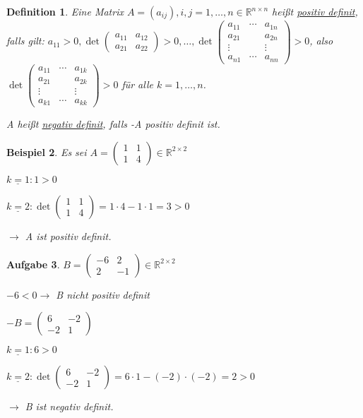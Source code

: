 \documentclass[12pt,a4paper]{scrreprt}
\newtheorem{defi}{Definition}[section]
\newtheorem{beispiel}[defi]{Beispiel}
\newtheorem{aufg}[defi]{Aufgabe}
\begin{document}
\begin{defi}
	Eine Matrix $A=(a_{ij}), i,j=1,\dots,n \in \mathbb{R}^{n\times n}$ heißt \underline{positiv definit}, falls gilt:
	$a_{11}>0,\det\begin{pmatrix}
	a_{11} & a_{12} \\ a_{21} & a_{22}
	\end{pmatrix} > 0, \dots, \det\begin{pmatrix}
	a_{11} & \cdots & a_{1n} \\
	a_{21} &  & a_{2n} \\
	\vdots & & \vdots \\
	a_{n1} & \cdots & a_{nn}
	\end{pmatrix} > 0$, also $\det\begin{pmatrix}
	a_{11} & \cdots & a_{1k} \\
	a_{21} &  & a_{2k} \\
	\vdots & & \vdots \\
	a_{k1} & \cdots & a_{kk}
	\end{pmatrix} > 0$ für alle $k=1,\dots,n$.
	
	A heißt \underline{negativ definit}, falls -A positiv definit ist.
\end{defi}

\begin{beispiel}
	Es sei $A=\begin{pmatrix}
	1 & 1 \\ 1 & 4
	\end{pmatrix} \in \mathbb{R}^{2\times 2}$
	
	$\underline{k=1}:1>0$
	
	$\underline{k=2}: \det\begin{pmatrix}
	1 & 1 \\ 1 & 4
	\end{pmatrix} = 1\cdot4-1\cdot1=3>0$
	
	$\to$ A ist positiv definit.
\end{beispiel}

\begin{aufg}
	$B=\begin{pmatrix}
	-6 & 2 \\ 2 & -1
	\end{pmatrix} \in \mathbb{R}^{2\times 2}$
	
	$-6<0 \to$ B nicht positiv definit
	
	$-B=\begin{pmatrix}
	6 & -2 \\ -2 & 1
	\end{pmatrix}$
	
	$\underline{k=1}:6>0$
	
	$\underline{k=2}: \det\begin{pmatrix}
	6 & -2 \\ -2 & 1
	\end{pmatrix} = 6\cdot1 - (-2)\cdot(-2)=2>0$
	
	$\to$ B ist negativ definit.
\end{aufg}
\end{document}
